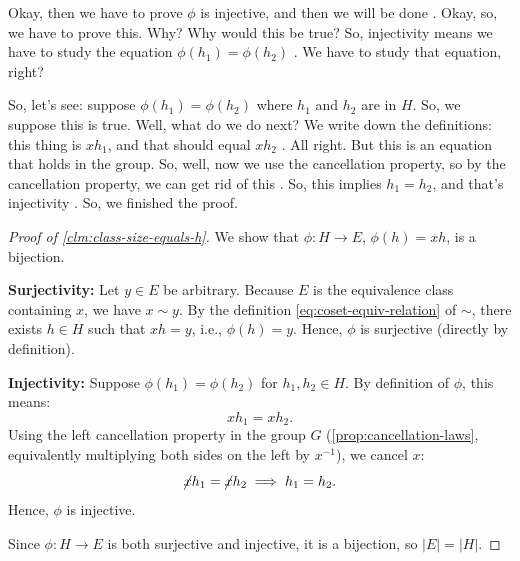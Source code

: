 \begin{proofWrapper}
\begin{speech}[00:24:43 - 00:26:58]
Okay, then we have to prove $\phi$ is injective, and then we will be done . Okay, so, we have to prove this. Why? Why would this be true? So, injectivity means we have to study the equation $\phi(h_1) = \phi(h_2)$ . We have to study that equation, right?

So, let's see: suppose $\phi(h_1) = \phi(h_2)$ where $h_1$ and $h_2$ are in $H$. So, we suppose this is true. Well, what do we do next? We write down the definitions: this thing is $x h_1$, and that should equal $x h_2$ . All right. But this is an equation that holds in the group. So, well, now we use the cancellation property, so by the cancellation property, we can get rid of this . So, this implies $h_1 = h_2$, and that's injectivity . So, we finished the proof.
\end{speech}

\begin{content}
\begin{proof}[Proof of \cref{clm:class-size-equals-h}]
We show that $\phi \colon H \to E$, $\phi(h) = xh$, is a bijection.

\textbf{Surjectivity:} Let $y \in E$ be arbitrary. Because $E$ is the equivalence class containing $x$, we have $x \sim y$. By the definition \eqref{eq:coset-equiv-relation} of $\sim$, there exists $h \in H$ such that $xh = y$, i.e., $\phi(h) = y$. Hence, $\phi$ is surjective (directly by definition).

\textbf{Injectivity:} Suppose $\phi(h_1) = \phi(h_2)$ for $h_1, h_2 \in H$. By definition of $\phi$, this means:
\[
x h_1 = x h_2.
\]
Using the left cancellation property in the group $G$ (\cref{prop:cancellation-laws}, equivalently multiplying both sides on the left by $x^{-1}$), we cancel $x$:
\[
\cancel{x} h_1 = \cancel{x} h_2 \implies h_1 = h_2.
\]
Hence, $\phi$ is injective.

Since $\phi \colon H \to E$ is both surjective and injective, it is a bijection, so $|E| = |H|$.
\end{proof}


\end{content}
\end{proofWrapper}
